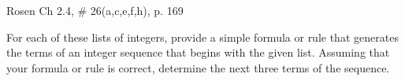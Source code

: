 \documentclass[11pt]{exam}
\begin{document}
\begin{questions}
\question[15] Rosen Ch 2.4, \# 26(a,c,e,f,h), p. 169
\begin{solution}
For each of these lists of integers, provide a simple formula or rule that generates the terms of an integer sequence that begins with the given list.  Assuming that your formula or rule is correct, determine the next three terms of the sequence. \\

\end{solution}
\end{questions}
\end{document}
